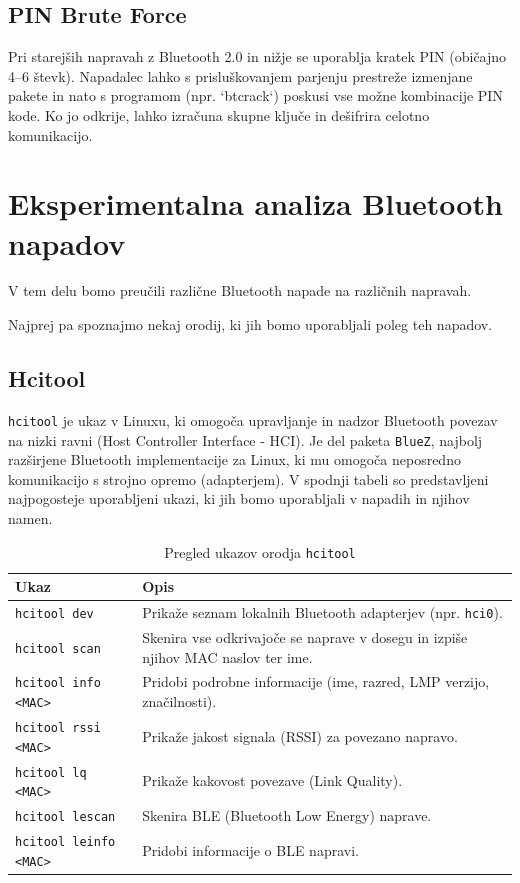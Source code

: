 \documentclass[11pt,a4paper,slovene]{article}
\begin{document}
\subsection{PIN Brute Force}
Pri starejših napravah z Bluetooth 2.0 in nižje se uporablja kratek PIN (običajno 4–6 števk). Napadalec lahko s prisluškovanjem parjenju prestreže izmenjane pakete in nato s programom (npr. `btcrack`) poskusi vse možne kombinacije PIN kode. Ko jo odkrije, lahko izračuna skupne ključe in dešifrira celotno komunikacijo.

\newpage

\section{Eksperimentalna analiza Bluetooth napadov}
V tem delu bomo preučili različne Bluetooth napade na različnih napravah.

Najprej pa spoznajmo nekaj orodij, ki jih bomo uporabljali poleg teh napadov.

\subsection{Hcitool}

\texttt{hcitool} je ukaz v Linuxu, ki omogoča upravljanje in nadzor Bluetooth povezav na nizki ravni (Host Controller Interface - HCI). Je del paketa \texttt{BlueZ}, najbolj razširjene Bluetooth implementacije za Linux, ki mu omogoča neposredno komunikacijo s strojno opremo (adapterjem). V spodnji tabeli so predstavljeni najpogosteje uporabljeni ukazi, ki jih bomo uporabljali v napadih in njihov namen.

\begin{table}[H]
	\centering
	\small
	\renewcommand{\arraystretch}{1.2}
	\begin{tabularx}{\linewidth}{|l|X|}
		\hline
		\textbf{Ukaz} & \textbf{Opis} \\
		\hline
		\texttt{hcitool dev} & Prikaže seznam lokalnih Bluetooth adapterjev (npr. \texttt{hci0}). \\
		\hline
		\texttt{hcitool scan} & Skenira vse odkrivajoče se naprave v dosegu in izpiše njihov MAC naslov ter ime. \\
		\hline
		\texttt{hcitool info <MAC>} & Pridobi podrobne informacije (ime, razred, LMP verzijo, značilnosti). \\
		\hline
		\texttt{hcitool rssi <MAC>} & Prikaže jakost signala (RSSI) za povezano napravo. \\
		\hline
		\texttt{hcitool lq <MAC>} & Prikaže kakovost povezave (Link Quality). \\
		\hline
		\texttt{hcitool lescan} & Skenira BLE (Bluetooth Low Energy) naprave. \\
		\hline
		\texttt{hcitool leinfo <MAC>} & Pridobi informacije o BLE napravi. \\
		\hline
	\end{tabularx}
	\caption{Pregled ukazov orodja \texttt{hcitool}}
	\label{tab:hcitool}
\end{table}
\end{document}
